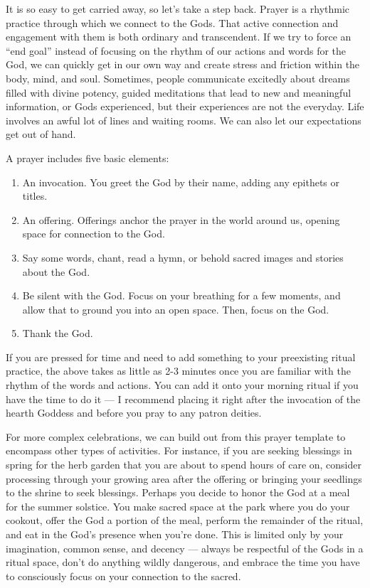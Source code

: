 \documentclass[
]{book}
\providecommand{\tightlist}{%
  \setlength{\itemsep}{0pt}\setlength{\parskip}{0pt}}
\begin{document}
It is so easy to get carried away, so let's take a step back. Prayer is a rhythmic practice through which we connect to the Gods. That active connection and engagement with them is both ordinary and transcendent. If we try to force an ``end goal'' instead of focusing on the rhythm of our actions and words for the God, we can quickly get in our own way and create stress and friction within the body, mind, and soul. Sometimes, people communicate excitedly about dreams filled with divine potency, guided meditations that lead to new and meaningful information, or Gods experienced, but their experiences are not the everyday. Life involves an awful lot of lines and waiting rooms. We can also let our expectations get out of hand.

A prayer includes five basic elements:

\begin{enumerate}
\def\labelenumi{\arabic{enumi}.}
\tightlist
\item
  An invocation. You greet the God by their name, adding any epithets or titles.
\item
  An offering. Offerings anchor the prayer in the world around us, opening space for connection to the God.
\item
  Say some words, chant, read a hymn, or behold sacred images and stories about the God.
\item
  Be silent with the God. Focus on your breathing for a few moments, and allow that to ground you into an open space. Then, focus on the God.
\item
  Thank the God.
\end{enumerate}

If you are pressed for time and need to add something to your preexisting ritual practice, the above takes as little as 2-3 minutes once you are familiar with the rhythm of the words and actions. You can add it onto your morning ritual if you have the time to do it --- I recommend placing it right after the invocation of the hearth Goddess and before you pray to any patron deities.

For more complex celebrations, we can build out from this prayer template to encompass other types of activities. For instance, if you are seeking blessings in spring for the herb garden that you are about to spend hours of care on, consider processing through your growing area after the offering or bringing your seedlings to the shrine to seek blessings. Perhaps you decide to honor the God at a meal for the summer solstice. You make sacred space at the park where you do your cookout, offer the God a portion of the meal, perform the remainder of the ritual, and eat in the God's presence when you're done. This is limited only by your imagination, common sense, and decency --- always be respectful of the Gods in a ritual space, don't do anything wildly dangerous, and embrace the time you have to consciously focus on your connection to the sacred.
\end{document}
